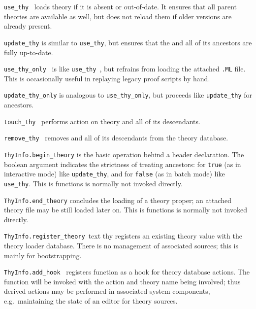 \begin{isabellebody}
\begin{isamarkuptext}
\begin{description}
  \item \verb|use_thy|~ loads theory  if it is absent
  or out-of-date.  It ensures that all parent theories are available
  as well, but does not reload them if older versions are already
  present.

  \item \verb|update_thy| is similar to \verb|use_thy|, but ensures that
  the  and all of its ancestors are fully up-to-date.

  \item \verb|use_thy_only|~ is like \verb|use_thy|~,
  but refrains from loading the attached \verb,.ML, file.
  This is occasionally useful in replaying legacy {\ML} proof scripts
  by hand.
  
  \item \verb|update_thy_only| is analogous to \verb|use_thy_only|, but
  proceeds like \verb|update_thy| for ancestors.

  \item \verb|touch_thy|~ performs  action on
  theory  and all of its descendants.

  \item \verb|remove_thy|~ removes  and all of its
  descendants from the theory database.

  \item \verb|ThyInfo.begin_theory| is the basic operation behind a
  \isa{{\isasymTHEORY}} header declaration.  The boolean argument
  indicates the strictness of treating ancestors: for \verb|true| (as
  in interactive mode) like \verb|update_thy|, and for \verb|false| (as
  in batch mode) like \verb|use_thy|.  This is {\ML} functions is
  normally not invoked directly.

  \item \verb|ThyInfo.end_theory| concludes the loading of a theory
  proper; an attached theory {\ML} file may be still loaded later on.
  This is {\ML} functions is normally not invoked directly.

  \item \verb|ThyInfo.register_theory|~{text thy} registers an existing
  theory value with the theory loader database.  There is no
  management of associated sources; this is mainly for bootstrapping.

  \item \verb|ThyInfo.add_hook|~ registers function  as a hook for theory database actions.  The function will be
  invoked with the action and theory name being involved; thus derived
  actions may be performed in associated system components, e.g.\
  maintaining the state of an editor for theory sources.


\end{description}
\end{isamarkuptext}
\end{isabellebody}
